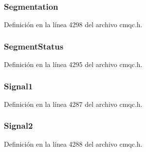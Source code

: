 \subsubsection[{Segmentation}]{ Segmentation}\label{structtag_m_q_g_m_o_a2fe04c63168add18793c3328bd6eb373}


Definición en la línea 4298 del archivo cmqc.\+h.

\hypertarget{structtag_m_q_g_m_o_a6184b6f6e6a01791ae04e35015fb3bd7}{}
\subsubsection[{Segment\+Status}]{ Segment\+Status}\label{structtag_m_q_g_m_o_a6184b6f6e6a01791ae04e35015fb3bd7}


Definición en la línea 4295 del archivo cmqc.\+h.

\hypertarget{structtag_m_q_g_m_o_a07b74d87b8eed659f524ba2c5c7dcb09}{}
\subsubsection[{Signal1}]{ Signal1}\label{structtag_m_q_g_m_o_a07b74d87b8eed659f524ba2c5c7dcb09}


Definición en la línea 4287 del archivo cmqc.\+h.

\hypertarget{structtag_m_q_g_m_o_afd4b361a08ee7dc496e720908aa9917a}{}
\subsubsection[{Signal2}]{ Signal2}\label{structtag_m_q_g_m_o_afd4b361a08ee7dc496e720908aa9917a}


Definición en la línea 4288 del archivo cmqc.\+h.

\hypertarget{structtag_m_q_g_m_o_a0530922ca944569b52601d74941f96e4}{}
